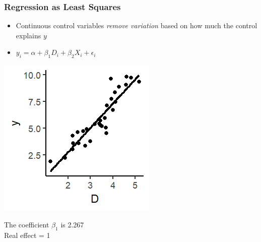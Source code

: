 \documentclass[xcolor=x11names,compress]{beamer}\usepackage[]{graphicx}\usepackage[]{color}
\makeatletter
\def\maxwidth{ %
  \ifdim\Gin@nat@width>\linewidth
    \linewidth
  \else
    \Gin@nat@width
  \fi
}
\newenvironment{knitrout}{}{} %
\renewcommand{\(}{\begin{columns}}
\renewcommand{\)}{\end{columns}}
\newcommand{\<}[1]{\begin{column}{#1}}
\renewcommand{\>}{\end{column}}
\makeatother
\begin{document}
\begin{frame}
\frametitle{Regression as Least Squares}
\begin{itemize}
\item Continuous control variables \textit{remove variation} based on how much the control explains $y$
\item $y_i = \alpha + \beta_1 D_i + \beta_2 X_i + \epsilon_i$
\end{itemize}
\begin{multicols}{2}
\begin{knitrout}
\color{fgcolor}
\includegraphics[width=\maxwidth]{figure/graph_ols_control1-1} 

\end{knitrout}
\columnbreak

The coefficient $\beta_1$ is 2.267 \\
Real effect = 1
\end{multicols}
\end{frame}
\end{document}
